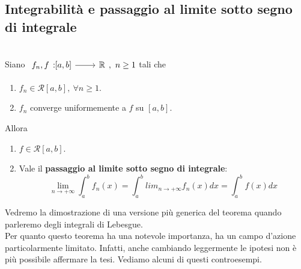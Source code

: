 \subsection{Integrabilità e passaggio al limite sotto segno di integrale}
\begin{theorema}~{}\\
	Siano $\funz{f_n,f}{\left[a,b\right]}{\realset},\ n\geq 1$ tali che
	\begin{enumerate}
		\item $f_n\in\mathcal{R}\left[a,b\right],\ \forall n\geq 1$.
		\item $f_n$ converge uniformemente a $f$ su $\left[a,b\right]$.
	\end{enumerate}
	Allora
	\begin{enumerate}
		\item $f\in\mathcal{R}\left[a,b\right]$.
		\item Vale il \textbf{passaggio al limite sotto segno di integrale}:
		\begin{equation}
			\lim_{n\to+\infty}\int_{a}^{b}f_n\left(x\right)=\int_{a}^{b}lim_{n\to+\infty}f_n\left(x\right)dx=\int_{a}^{b}f\left(x\right)dx
		\end{equation}
	\end{enumerate}
\end{theorema}
Vedremo la dimostrazione di una versione più generica del teorema quando parleremo degli integrali di Lebesgue.\\
Per quanto questo teorema ha una notevole importanza, ha un campo d'azione particolarmente limitato. Infatti, anche cambiando leggermente le ipotesi non è più possibile affermare la tesi. Vediamo alcuni di questi controesempi.

